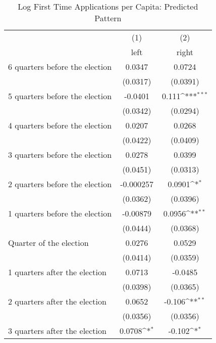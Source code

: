 \begin{table}[htbp]\centering
\def\sym#1{\ifmmode^{#1}\else\(^{#1}\)\fi}
\caption{Log First Time Applications per Capita: Predicted Pattern}
\begin{tabular}{l*{2}{c}}
\hline\hline
                    &\multicolumn{1}{c}{(1)}&\multicolumn{1}{c}{(2)}\\
                    &\multicolumn{1}{c}{left}&\multicolumn{1}{c}{right}\\
\hline
 6 quarters before the election&      0.0347         &      0.0724         \\
                    &    (0.0317)         &    (0.0391)         \\
[1em]
 5 quarters before the election&     -0.0401         &       0.111\sym{***}\\
                    &    (0.0342)         &    (0.0294)         \\
[1em]
 4 quarters before the election&      0.0207         &      0.0268         \\
                    &    (0.0422)         &    (0.0409)         \\
[1em]
 3 quarters before the election&      0.0278         &      0.0399         \\
                    &    (0.0451)         &    (0.0313)         \\
[1em]
 2 quarters before the election&   -0.000257         &      0.0901\sym{*}  \\
                    &    (0.0362)         &    (0.0396)         \\
[1em]
 1 quarters before the election&    -0.00879         &      0.0956\sym{**} \\
                    &    (0.0444)         &    (0.0368)         \\
[1em]
Quarter of the election&      0.0276         &      0.0529         \\
                    &    (0.0414)         &    (0.0359)         \\
[1em]
 1 quarters after the election&      0.0713         &     -0.0485         \\
                    &    (0.0398)         &    (0.0365)         \\
[1em]
 2 quarters after the election&      0.0652         &      -0.106\sym{**} \\
                    &    (0.0356)         &    (0.0356)         \\
[1em]
 3 quarters after the election&      0.0708\sym{*}  &      -0.102\sym{*}  \\

\end{tabular}
\end{table}
